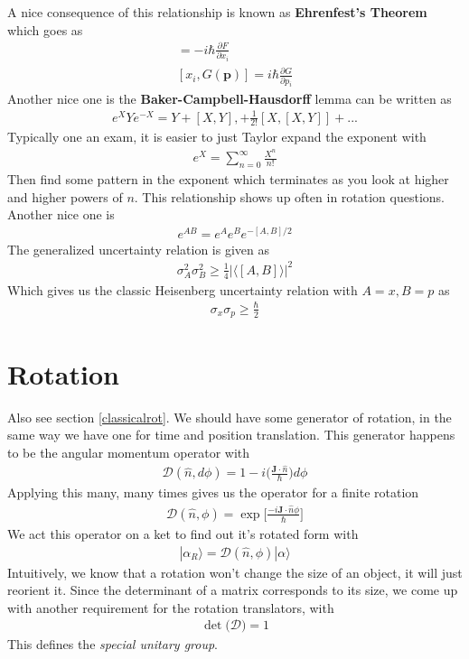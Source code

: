 A nice consequence of this relationship is known as \textbf{Ehrenfest's Theorem} which goes as 
\begin{align}
[p_i,F(\textbf{x})] = -i\hbar\frac{\partial F}{\partial x_i}\\
[x_i,G(\textbf{p})] = i\hbar\frac{\partial G}{\partial p_i}
\end{align}
Another nice one is the \textbf{Baker-Campbell-Hausdorff} lemma can be written as
\begin{align}
e^X Ye^{-X} = Y + [X,Y], + \frac{1}{2!}[X,[X,Y]] + ...
\end{align}
Typically one an exam, it is easier to just Taylor expand the exponent with 
\begin{align}
e^X = \sum_{n=0}^\infty \frac{X^n}{n!}
\end{align}
Then find some pattern in the exponent which terminates as you look at higher and higher powers of $n$. This relationship shows up often in rotation questions. Another nice one is
\begin{align}
 e^{AB} = e^Ae^Be^{-[A,B]/2}
\end{align}
 The generalized uncertainty relation is given as
\begin{align}
\sigma_A^2\sigma_B^2 \ge \frac{1}{4} |\langle [A,B]\rangle |^2
\end{align}
Which gives us the classic Heisenberg uncertainty relation with $A=x,B=p$ as
\begin{align}
\sigma_x\sigma_p \ge \frac{\hbar}{2}
\end{align}





\section{Rotation}
Also see section \ref{classicalrot}. We should have some generator of rotation, in the same way we have one for time and position translation. This generator happens to be the angular momentum operator with
\begin{align}
\mathcal{D}(\hat{n},d\phi) = 1 - i\Big(\frac{\textbf{J}\cdot\hat{n}}{\hbar}\Big)d\phi
\end{align}
Applying this many, many times gives us the operator for a finite rotation
\begin{align}\label{rotation}
\mathcal{D}(\hat{n}, \phi) = \exp\Big[\frac{-i\textbf{J}\cdot\hat{n}\phi}{\hbar}\Big]
\end{align}
We act this operator on a ket to find out it's rotated form with
\begin{align}
|\alpha_R\rangle = \mathcal{D}(\hat{n}, \phi)|\alpha\rangle
\end{align}
Intuitively, we know that a rotation won't change the size of an object, it will just reorient it. Since the determinant of a matrix corresponds to its size, we come up with another requirement for the rotation translators, with
\begin{align}\label{specialunitary}
    \det\Big(\mathcal{D}\Big) = 1
\end{align}
This defines the \emph{special unitary group}. 



